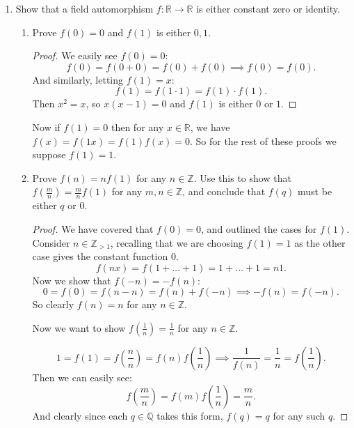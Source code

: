 \documentclass{article}
\begin{document}
\begin{enumerate}
\begin{proof}
        \end{proof}
    \item Show that a field automorphism $f:\mathbb{R}\to \mathbb{R}$
        is either constant zero or identity.

        \begin{enumerate}[label= (\alph*)] 
            \item Prove $f(0)=0$ and $f(1)$ is either $0,1$.
                \begin{proof} 
                    We easily see $f(0)=0$:
                    \[
                    f(0)=f(0+0)=f(0)+f(0)\implies f(0)=f(0)
                    .\] 
                    And similarly, letting $f(1)=x$:
                    \[
                    f(1)=f(1\cdot 1)=f(1)\cdot f(1)
                    .\] 
                    Then $x^2=x$, so $x(x-1)=0$ and $f(1)$ is either $0$ or $1$.
                \end{proof}

                    Now if $f(1)=0$ then for any $x\in \mathbb{R}$, we have $f(x)=f(1x)=f(1)f(x)=0$.
                    So for the rest of these proofs we suppose $f(1)=1$.
            \item Prove $f(n)=nf(1)$ for any $n\in \mathbb{Z}$. Use this to show that
                $f\left( \frac{m}{n} \right) =\frac{m}{n}f(1)$ for any $m,n\in \mathbb{Z}$, and
                conclude that $f(q)$ must be either $q$ or $0$.
                \begin{proof} 
                    We have covered that $f(0)=0$, and outlined the cases for $f(1)$.
                    Consider $n\in \mathbb{Z}_{>1}$, recalling that we are choosing $f(1)=1$ 
                    as the other case gives the constant function $0$.
                    \[
                    f(nx)=f(1+\ldots+1)=1+\ldots+1=n1
                    .\] 
                    Now we show that $f(-n)=-f(n)$:
                    \[
                    0=f(0)=f(n-n)=f(n)+f(-n)\implies-f(n)=f(-n)
                    .\] 
                    So clearly $f(n)=n$ for any $n\in \mathbb{Z}$.

                    Now we want to show $f\left( \frac{1}{n} \right) =\frac{1}{n}$ for any 
                    $n\in \mathbb{Z}$.

                    \[
                    1=f(1)=f\left( \frac{n}{n} \right) =f(n)f\left( \frac{1}{n} \right) 
                    \implies \frac{1}{f(n)}=\frac{1}{n}=f\left(\frac{1}{n}\right)
                    .\] 
                    Then we can easily see:
                    \[
                    f\left( \frac{m}{n} \right) =f(m)f\left( \frac{1}{n} \right) =\frac{m}{n}
                    .\] 
                    And clearly since each $q\in \mathbb{Q}$ takes this form, $f(q)=q$ for any such 
                    $q$.
                \end{proof}


\end{enumerate}
\end{enumerate}
\end{document}
